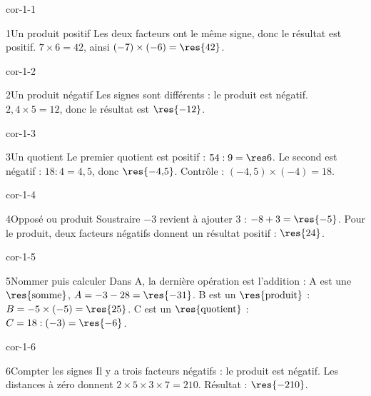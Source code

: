 \clearpage\pagestyle{otMain}\setlength{\otBlocEspacement}{2.5mm}\fontsize{11}{15}\selectfont{}
\begin{blocLivre}{cor-1-1}\begin{corrige}{1}{Un produit positif}
Les deux facteurs ont le même signe, donc le résultat est positif. $7\times6=42$, ainsi $(-7)\times(-6)=\res{42}$.
\end{corrige}\end{blocLivre}
\begin{blocLivre}{cor-1-2}\begin{corrige}{2}{Un produit négatif}
Les signes sont différents : le produit est négatif. $2{,}4\times5=12$, donc le résultat est $\res{-12}$.
\end{corrige}\end{blocLivre}
\begin{blocLivre}{cor-1-3}\begin{corrige}{3}{Un quotient}
Le premier quotient est positif : $54:9=\res6$. Le second est négatif : $18:4=4{,}5$, donc $\res{-4{,}5}$. Contrôle : $(-4{,}5)\times(-4)=18$.
\end{corrige}\end{blocLivre}
\begin{blocLivre}{cor-1-4}\begin{corrige}{4}{Opposé ou produit}
Soustraire $-3$ revient à ajouter 3 : $-8+3=\res{-5}$. Pour le produit, deux facteurs négatifs donnent un résultat positif : $\res{24}$.
\end{corrige}\end{blocLivre}
\begin{blocLivre}{cor-1-5}\begin{corrige}{5}{Nommer puis calculer}
Dans A, la dernière opération est l’addition : A est une $\res{\text{somme}}$, $A=-3-28=\res{-31}$. B est un $\res{\text{produit}}$ : $B=-5\times(-5)=\res{25}$. C est un $\res{\text{quotient}}$ : $C=18:(-3)=\res{-6}$.
\end{corrige}\end{blocLivre}
\begin{blocLivre}{cor-1-6}\begin{corrige}{6}{Compter les signes}
Il y a trois facteurs négatifs : le produit est négatif. Les distances à zéro donnent $2\times5\times3\times7=210$. Résultat : $\res{-210}$.
\end{corrige}\end{blocLivre}
